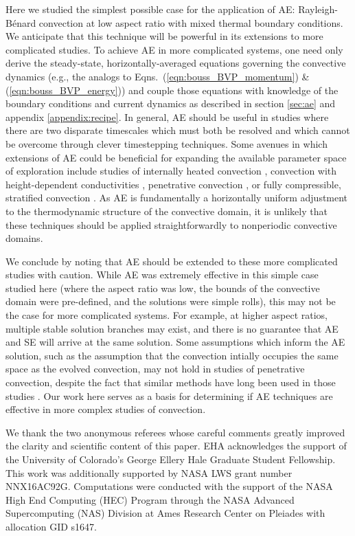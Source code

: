 \documentclass[aps, pre, onecolumn, nofootinbib, notitlepage, groupedaddress, amsfonts, amssymb, amsmath, longbibliography]{revtex4-1}
\newcommand{\RB}{Rayleigh-B\'{e}nard }
\begin{document}
Here we studied the simplest possible case for the application of AE:
\RB convection at low aspect ratio with mixed thermal boundary conditions. 
We anticipate that
this technique will be powerful in its extensions to more complicated studies.
To achieve AE in more complicated systems, one need only derive 
the steady-state, horizontally-averaged equations governing
the convective dynamics
(e.g., the analogs to Eqns.~(\ref{eqn:bouss_BVP_momentum}) \& (\ref{eqn:bouss_BVP_energy}))
and couple those equations with knowledge of the boundary conditions
and current dynamics as described in
section \ref{sec:ae} and appendix \ref{appendix:recipe}.
In general, AE should be useful in studies where there are two disparate
timescales which must both be resolved and which cannot be overcome through
clever timestepping techniques.  Some avenues in which extensions of AE could
be beneficial for expanding the available parameter space of exploration
include studies of internally heated convection \cite{goluskin2016},
convection with height-dependent conductivities \cite{kapyla&all2017},
penetrative convection \cite{hurlburt&all1986,brandenburg&all2005,couston&all2017},
or fully compressible, stratified convection \cite{anders&brown2017}.
As AE is fundamentally a horizontally uniform adjustment to the thermodynamic
structure of the convective domain, it is unlikely that these techniques
should be applied straightforwardly to nonperiodic convective domains.

We conclude by noting that AE should be extended to these more complicated
studies with caution. 
While AE was extremely effective in this simple case studied here
(where the aspect ratio was low, 
the bounds of the convective domain were pre-defined,
and the solutions were simple rolls),
this may not be the case for more complicated systems. For example, at
higher aspect ratios, multiple stable solution branches 
may exist, and there is no guarantee that AE and SE will
arrive at the same solution. 
Some assumptions which inform the AE solution, such as the assumption
that the convection
intially occupies the same space as the evolved convection, may not hold in
studies of penetrative convection, despite the fact that similar methods have
long been used in those studies \cite{hurlburt&all1986}.
Our work here serves as a basis for determining if AE techniques are
effective in more complex studies of convection.

\begin{acknowledgments}
We thank the two anonymous referees whose careful comments greatly 
improved the clarity and scientific content of this paper.
EHA acknowledges the support of the University of Colorado's George 
Ellery Hale Graduate Student Fellowship.
This work was additionally supported by  NASA LWS grant number NNX16AC92G.  
Computations were conducted 
with the support of the NASA High End Computing (HEC) Program through the NASA 
Advanced Supercomputing (NAS) Division at Ames Research Center on Pleiades
with allocation GID s1647.
\end{acknowledgments}
\end{document}
